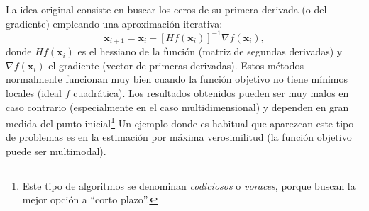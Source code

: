 \documentclass[
  spanish,
  10pt,
]{book}
\renewcommand{\mathbf}[1]{\symbf{#1}}
\theoremstyle{break}
\theoremstyle{nonumberplain}
\let\oldfootnote\footnote
\renewcommand\footnote[1]{\oldfootnote{\hspace{2mm}#1}}
\begin{document}
La idea original consiste en buscar los ceros de su primera derivada (o del gradiente) empleando una aproximación iterativa:
\[\mathbf{x}_{i+1} = \mathbf{x}_i-[Hf(\mathbf{x}_i)]^{-1}\nabla f(\mathbf{x}_i),\]
donde \(Hf(\mathbf{x}_i)\) es el hessiano de la función (matriz de segundas derivadas) y \(\nabla f(\mathbf{x}_i)\) el gradiente (vector de primeras derivadas).
Estos métodos normalmente funcionan muy bien cuando la función objetivo no tiene mínimos locales (ideal \(f\) cuadrática).
Los resultados obtenidos pueden ser muy malos en caso contrario (especialmente en el caso multidimensional) y dependen en gran medida del punto inicial\footnote{Este tipo de algoritmos se denominan \emph{codiciosos} o \emph{voraces}, porque buscan la mejor opción a ``corto plazo''.}
Un ejemplo donde es habitual que aparezcan este tipo de problemas es en la estimación por máxima verosimilitud (la función objetivo puede ser multimodal).
\end{document}
